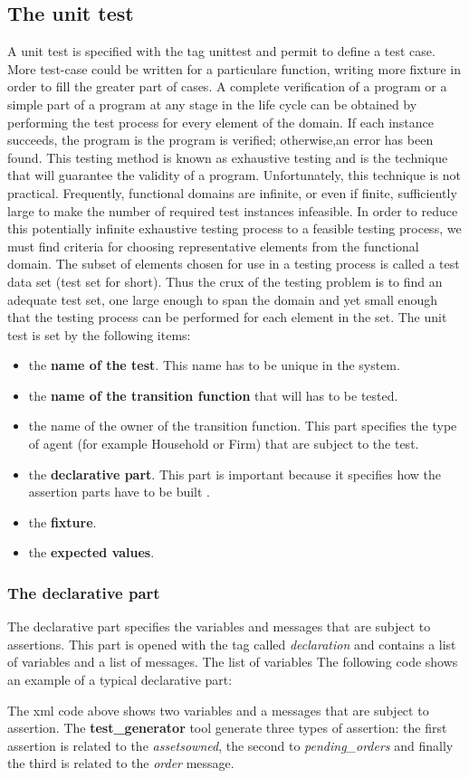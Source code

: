 \documentclass[a4paper,10pt]{article}
\begin{document}
\subsection{The unit test}
A unit test is specified with the tag unittest and permit to define a test case. More test-case could be written for a particulare function, writing  more fixture in order to fill the greater part of cases. A complete verification of a program or a simple part of a program at any stage in the life cycle can be obtained
by performing the test process for every element of the domain. If each instance succeeds, the program is the program is verified; otherwise,an error has been found. This testing method is known as exhaustive testing and
is the technique that will guarantee the validity of a program.
Unfortunately, this technique is not practical. Frequently, functional domains are infinite, or even if finite, sufficiently large to make the number of required test instances infeasible. In order to reduce this potentially infinite exhaustive testing process to a feasible testing process, we must find criteria for choosing
representative elements from the functional domain. 
The subset of elements chosen for use in a testing process is called a test data set (test set for short). Thus the crux of the testing problem is to find an adequate test set, one large enough to span the domain and yet small enough that the testing process can be performed for each element in the set.
The  unit test is set by the following items:
\begin{itemize}
\item the \textbf{name of the test}. This name has to be unique in the  system.
\item the \textbf{name of the transition function} that will has to be tested.
\item the name of the owner of the transition function. This part specifies the type of agent (for example Household or Firm) that are subject to the test.
\item the \textbf{declarative part}. This part is important because it specifies how the assertion parts have to be built .
\item the \textbf{fixture}. 
\item the \textbf{expected values}.
\end{itemize}
\subsubsection{The declarative part}
The declarative part specifies the variables and messages that are subject to assertions. This part is opened with the tag called \textit{declaration} and contains a list of variables and a list of messages. The list of variables 
The following code shows an example of a typical declarative part:

The xml code above shows two variables and a messages that are subject to assertion. The \textbf{test\_generator} tool generate three types of assertion: the first assertion is related to the \textit{assetsowned}, the second to \textit{pending\_orders } and finally the third is related to the \textit{order }message.
\end{document}
